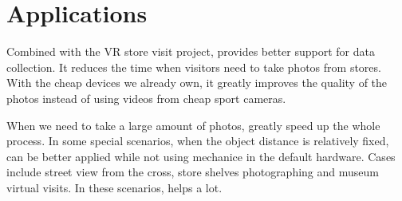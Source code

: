 \section{Applications}

Combined with the VR store visit project, \sysname provides better support for data collection.
It reduces the time when visitors need to take photos from stores.
With the cheap devices we already own, it greatly improves the quality of the photos instead of using videos from cheap sport cameras.

When we need to take a large amount of photos, \sysname greatly speed up the whole process.
In some special scenarios, when the object distance is relatively fixed, \sysname can be better applied while not using mechanice in the default hardware.
Cases include street view from the cross, store shelves photographing and museum virtual visits.
In these scenarios, \sysname helps a lot.
